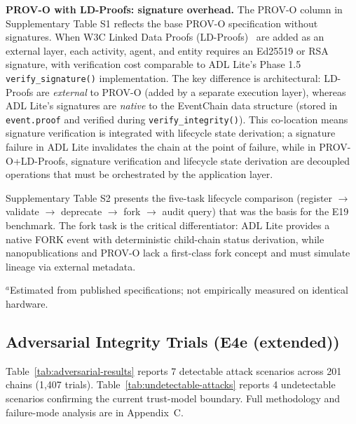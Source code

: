 \textbf{PROV-O with LD-Proofs: signature overhead.} The PROV-O column in Supplementary Table S1 reflects the base PROV-O specification without signatures. When W3C Linked Data Proofs (LD-Proofs)~\cite{linked_data_proofs} are added as an external layer, each activity, agent, and entity requires an Ed25519 or RSA signature, with verification cost comparable to ADL Lite's Phase 1.5 \texttt{verify\_signature()} implementation. The key difference is architectural: LD-Proofs are \emph{external} to PROV-O (added by a separate execution layer), whereas ADL Lite's signatures are \emph{native} to the EventChain data structure (stored in \texttt{event.proof} and verified during \texttt{verify\_integrity()}). This co-location means signature verification is integrated with lifecycle state derivation; a signature failure in ADL Lite invalidates the chain at the point of failure, while in PROV-O+LD-Proofs, signature verification and lifecycle state derivation are decoupled operations that must be orchestrated by the application layer.

Supplementary Table S2 presents the five-task lifecycle comparison (register $\to$ validate $\to$ deprecate $\to$ fork $\to$ audit query) that was the basis for the E19 benchmark. The fork task is the critical differentiator: ADL Lite provides a native \textsc{FORK} event with deterministic child-chain status derivation, while nanopublications and PROV-O lack a first-class fork concept and must simulate lineage via external metadata.

$^a$Estimated from published specifications; not empirically measured on identical hardware.

\subsection{Adversarial Integrity Trials (E4e (extended))}\label{subsec:adversarial-trials}

Table~\ref{tab:adversarial-results} reports 7 detectable attack scenarios across 201 chains (1,407 trials). Table~\ref{tab:undetectable-attacks} reports 4 undetectable scenarios confirming the current trust-model boundary. Full methodology and failure-mode analysis are in Appendix~C.

